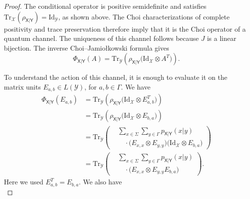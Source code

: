 \documentclass[
    aps,
    pra,
    reprint,
    superscriptaddress,
    nofootinbib
]{revtex4-2}
\theoremstyle{definition}
\theoremstyle{plain}
\begin{document}
\begin{proof}
The conditional operator is positive semidefinite and satisfies
$\mathrm{Tr}_{\mathcal{X}}
(\rho_{\mathsf{X}|\mathsf{Y}})=\mathrm{Id}_{\mathcal{Y}}$, as shown
above. The Choi characterizations of complete positivity and trace
preservation therefore imply that it is the Choi operator of a quantum
channel. The uniqueness of this channel follows because $J$ is a linear
bijection. The inverse Choi--Jamio{\l}kowski formula gives
\begin{equation}
    \Phi_{\mathsf{X}|\mathsf{Y}}(A)
    =
    \mathrm{Tr}_{\mathcal{Y}}
    \left(
        \rho_{\mathsf{X}|\mathsf{Y}}
        \bigl(
            \mathrm{Id}_{\mathcal{X}}\otimes A^{T}
        \bigr)
    \right).
\end{equation}

To understand the action of this channel, it is enough to evaluate it on
the matrix units $E_{a,b}\in L(\mathcal{Y})$, for $a,b\in\Gamma$. We have
\begin{align}
    \Phi_{\mathsf{X}|\mathsf{Y}}(E_{a,b})
    &=
    \mathrm{Tr}_{\mathcal{Y}}
    \left(
        \rho_{\mathsf{X}|\mathsf{Y}}
        \bigl(
            \mathrm{Id}_{\mathcal{X}}\otimes E_{a,b}^{T}
        \bigr)
    \right)\\
    &=
    \mathrm{Tr}_{\mathcal{Y}}
    \left(
        \rho_{\mathsf{X}|\mathsf{Y}}
        \bigl(
            \mathrm{Id}_{\mathcal{X}}\otimes E_{b,a}
        \bigr)
    \right)\\
    &=
    \mathrm{Tr}_{\mathcal{Y}}
    \left(
        \begin{aligned}
        &\sum_{x\in\Sigma}\sum_{y\in\Gamma}
        p_{\mathsf{X}|\mathsf{Y}}(x|y)\\[-0.25em]
        &\quad\cdot
        \bigl(E_{x,x}\otimes E_{y,y}\bigr)
        \bigl(
            \mathrm{Id}_{\mathcal{X}}\otimes E_{b,a}
        \bigr)
        \end{aligned}
    \right)\\
    &=
    \mathrm{Tr}_{\mathcal{Y}}
    \left(
        \begin{aligned}
        &\sum_{x\in\Sigma}\sum_{y\in\Gamma}
        p_{\mathsf{X}|\mathsf{Y}}(x|y)\\[-0.25em]
        &\quad\cdot
        \bigl(
            E_{x,x}\otimes E_{y,y}E_{b,a}
        \bigr)
        \end{aligned}
    \right).
\end{align}
Here we used $E_{a,b}^{T}=E_{b,a}$. We also have
\begin{equation}

\end{equation}
\end{proof}
\end{document}
